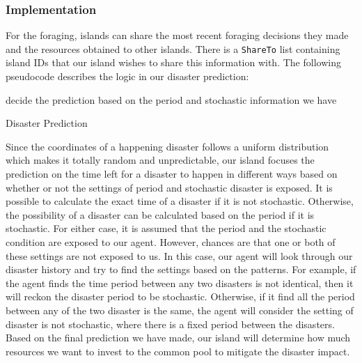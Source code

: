 \subsubsection{Implementation} \label{subsubsec:Team6_IIFO:Implementation}
For the foraging, islands can share the most recent foraging decisions they made and the resources obtained to other islands. There is a \texttt{ShareTo} list containing island IDs that our island wishes to share this information with. The following pseudocode describes the logic in our disaster prediction:
\begin{algorithm}[!h]
\SetAlgoLined
    decide the prediction based on the period and stochastic information we have\;
    \caption{Disaster Prediction}
\end{algorithm}


Since the coordinates of a happening disaster follows a uniform distribution which makes it totally random and unpredictable, our island focuses the prediction on the time left for a disaster to happen in different ways based on whether or not the settings of period and stochastic disaster is exposed. It is possible to calculate the exact time of a disaster if it is not stochastic. Otherwise, the possibility of a disaster can be calculated based on the period if it is stochastic. For either case, it is assumed that the period and the stochastic condition are exposed to our agent. However, chances are that one or both of these settings are not exposed to us. In this case, our agent will look through our disaster history and try to find the settings based on the patterns. For example, if the agent finds the time period between any two disasters is not identical, then it will reckon the disaster period to be stochastic. Otherwise, if it find all the period between any of the two disaster is the same, the agent will consider the setting of disaster is not stochastic, where there is a fixed period between the disasters. Based on the final prediction we have made, our island will determine how much resources we want to invest to the common pool to mitigate the disaster impact.

